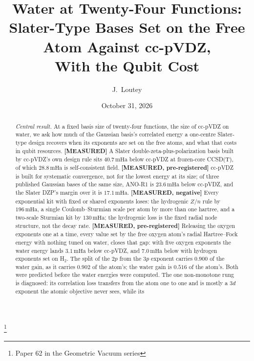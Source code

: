 \documentclass[aps,pra,twocolumn,superscriptaddress,longbibliography]{revtex4-2}
\newcommand{\gvq}[2]{#2}
\newcommand{\mHa}{\,\mathrm{mHa}}
\begin{document}
\title{Water at Twenty-Four Functions:\\
Slater-Type Bases Set on the Free Atom Against cc-pVDZ,\\
With the Qubit Cost}
\thanks{Paper 62 in the Geometric Vacuum series}

\author{J.~Loutey}

\date{October 31, 2026}

\begin{abstract}
\emph{Central result.}  At a fixed basis size of twenty-four functions,
the size of cc-pVDZ on water, we ask how much of the Gaussian basis's
correlated energy a one-centre Slater-type design recovers when its
exponents are set on the free atoms, and what that costs in qubit
resources.  \textbf{[MEASURED]} A Slater double-zeta-plus-polarization
basis built by cc-pVDZ's own design rule sits
$\gvq{p62_dzp_vs_ccpvdz_mha}{40.7}\mHa$ below cc-pVDZ at frozen-core
CCSD(T), of which $\gvq{p62_dzp_vs_ccpvdz_scf_mha}{28.8}\mHa$ is
self-consistent field.  \textbf{[MEASURED, pre-registered]} cc-pVDZ is
built for systematic convergence, not for the lowest energy at its size;
of three published Gaussian bases of the same size, ANO-R1 is
$\gvq{p62_anor1_vs_ccpvdz_mha}{23.6}\mHa$ below cc-pVDZ, and the Slater
DZP's margin over it is $\gvq{p62_dzp_vs_anor1_mha}{17.1}\mHa$.
\textbf{[MEASURED, negative]} Every exponential
kit with fixed or shared exponents loses: the hydrogenic $Z/n$ rule by
$\gvq{p62_hyd_above_ccpvdz_mha}{196}\mHa$, a single Coulomb--Sturmian
scale per atom by more than one hartree, and a two-scale Sturmian kit
by $\gvq{p62_two_scale_above_ccpvdz_mha}{130}\mHa$; the hydrogenic
loss is the fixed radial node structure, not the decay rate.
\textbf{[MEASURED, pre-registered]} Releasing the oxygen exponents one
at a time, every value set by the free oxygen atom's radial Hartree--Fock
energy with nothing tuned on water, closes that gap: with five oxygen
exponents the water energy lands $\gvq{p62_r5_below_ccpvdz_mha}{3.1}\mHa$
below cc-pVDZ, and $\gvq{p62_r5h_below_ccpvdz_mha}{7.0}\mHa$ below with
hydrogen exponents set on H$_2$.  The split of the $2p$ from the $3p$
exponent carries $\gvq{p62_sl1_ratio}{0.900}$ of the water gain, as it
carries $0.902$ of the atom's; the water gain is
$\gvq{p62_sl2_ratio}{0.516}$ of the atom's.  Both were predicted before
the water energies were computed.  The one non-monotone rung is
diagnosed: its correlation loss transfers from the atom one to one and is
mostly a $3d$ exponent the atomic objective never sees, while its

\end{abstract}
\end{document}
